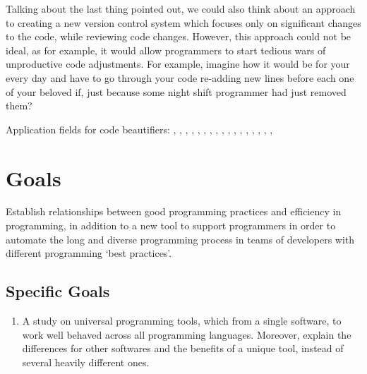 \begin{englishtext}
    Talking about the last thing pointed out, we could also think about an
    approach to creating a new version control system which focuses only on
    significant changes to the code, while reviewing code changes. However, this
    approach could not be ideal, as for example, it would allow programmers to
    start tedious wars of unproductive code adjustments. For example, imagine
    how it would be for your every day and have to go through your code
    re-adding new lines before each one of your beloved if\s, just because some
    night shift programmer had just removed them?


    Application fields for code beautifiers:
    ,
    ,
    ,
    ,
    ,
    ,
    ,
    ,
    ,
    ,
    ,
    ,
    ,
    ,
    ,
    ,
    ,

    \section{Goals}

    Establish relationships between good programming practices and efficiency in
    programming, in addition to a new tool to support programmers in order to
    automate the long and diverse programming process in teams of developers
    with different programming `best practices'. \cite{pushdownAutomata}


    \subsection{Specific Goals}

    \begin{enumerate}
        \item A study on universal programming tools, which from a single
        software, to work well behaved across all programming languages.
        Moreover, explain the differences for other softwares and the benefits
        of a unique tool, instead of several heavily different ones.


\end{enumerate}
\end{englishtext}
